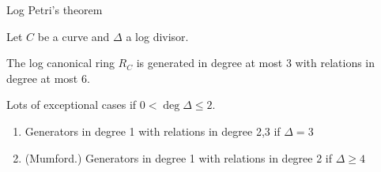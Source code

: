 \begin{frame}{Log Petri's theorem}


    Let $C$ be a curve and $\Delta$ a log divisor. 

  \begin{theorem}[Voight, ZB]
  The log canonical ring $R_C$ is generated in degree at most 3 with relations in degree at most 6.
  \end{theorem}

  \begin{remark}
    Lots of exceptional cases if $0 < \deg \Delta  \leq 2$.
  \end{remark}

  \begin{remark}
    \begin{enumerate}
    \item Generators in degree 1 with relations in degree 2,3 if
      $\Delta = 3$
    \item   
     (Mumford.) Generators in degree 1 with relations in degree 2 if $\Delta \geq 4$
   \end{enumerate}
 \end{remark}



\end{frame}
